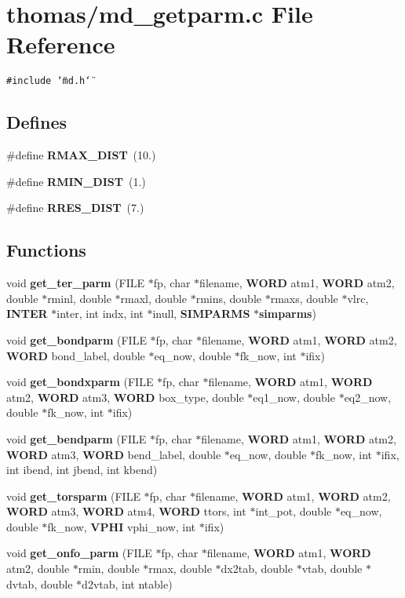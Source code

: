 \section{thomas/md\_\-getparm.c File Reference}
\label{thomas_2md__getparm_8c}
{\tt \#include \char`\"{}md.h\char`\"{}}\par
\subsection*{Defines}
\begin{CompactItemize}
\item 
\#define {\bf RMAX\_\-DIST}~(10.)
\item 
\#define {\bf RMIN\_\-DIST}~(1.)
\item 
\#define {\bf RRES\_\-DIST}~(7.)
\end{CompactItemize}
\subsection*{Functions}
\begin{CompactItemize}
\item 
void {\bf get\_\-ter\_\-parm} (FILE $\ast$fp, char $\ast$filename, {\bf WORD} atm1, {\bf WORD} atm2, double $\ast$rminl, double $\ast$rmaxl, double $\ast$rmins, double $\ast$rmaxs, double $\ast$vlrc, {\bf INTER} $\ast$inter, int indx, int $\ast$inull, {\bf SIMPARMS} $\ast${\bf simparms})
\item 
void {\bf get\_\-bondparm} (FILE $\ast$fp, char $\ast$filename, {\bf WORD} atm1, {\bf WORD} atm2, {\bf WORD} bond\_\-label, double $\ast$eq\_\-now, double $\ast$fk\_\-now, int $\ast$ifix)
\item 
void {\bf get\_\-bondxparm} (FILE $\ast$fp, char $\ast$filename, {\bf WORD} atm1, {\bf WORD} atm2, {\bf WORD} atm3, {\bf WORD} box\_\-type, double $\ast$eq1\_\-now, double $\ast$eq2\_\-now, double $\ast$fk\_\-now, int $\ast$ifix)
\item 
void {\bf get\_\-bendparm} (FILE $\ast$fp, char $\ast$filename, {\bf WORD} atm1, {\bf WORD} atm2, {\bf WORD} atm3, {\bf WORD} bend\_\-label, double $\ast$eq\_\-now, double $\ast$fk\_\-now, int $\ast$ifix, int ibend, int jbend, int kbend)
\item 
void {\bf get\_\-torsparm} (FILE $\ast$fp, char $\ast$filename, {\bf WORD} atm1, {\bf WORD} atm2, {\bf WORD} atm3, {\bf WORD} atm4, {\bf WORD} ttors, int $\ast$int\_\-pot, double $\ast$eq\_\-now, double $\ast$fk\_\-now, {\bf VPHI} vphi\_\-now, int $\ast$ifix)
\item 
void {\bf get\_\-onfo\_\-parm} (FILE $\ast$fp, char $\ast$filename, {\bf WORD} atm1, {\bf WORD} atm2, double $\ast$rmin, double $\ast$rmax, double $\ast$dx2tab, double $\ast$vtab, double $\ast$dvtab, double $\ast$d2vtab, int ntable)
\end{CompactItemize}


